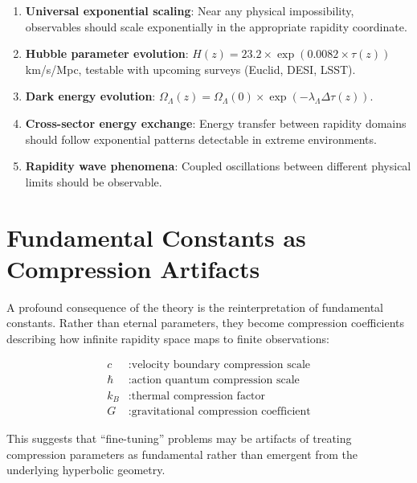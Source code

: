 \documentclass[12pt,a4paper]{article}
\begin{document}
\begin{enumerate}
    \item \textbf{Universal exponential scaling}: Near any physical impossibility, 
                                                  observables should scale exponentially 
                                                  in the appropriate rapidity coordinate.    
    \item \textbf{Hubble parameter evolution}: $H(z) = 23.2 \times \exp(0.0082 \times \tau(z))$ km/s/Mpc, 
                                               testable with upcoming surveys (Euclid, DESI, LSST).    
    \item \textbf{Dark energy evolution}: $\Omega_\Lambda(z) = \Omega_\Lambda(0) \times \exp(-\lambda_\Lambda \Delta\tau(z))$.    
    \item \textbf{Cross-sector energy exchange}: Energy transfer between rapidity 
                                                 domains should follow exponential 
                                                 patterns detectable in extreme 
                                                 environments.
    \item \textbf{Rapidity wave phenomena}: Coupled oscillations between different 
                                            physical limits should be observable.
\end{enumerate}

\section{Fundamental Constants as Compression Artifacts}

A profound consequence of the theory is the reinterpretation of fundamental constants. 
Rather than eternal parameters, they become compression coefficients describing 
how infinite rapidity space maps to finite observations:

\begin{align}
c       & : \text{velocity boundary compression scale} \\
\hbar   & : \text{action quantum compression scale} \\
k_B     & : \text{thermal compression factor} \\
G       & : \text{gravitational compression coefficient}
\end{align}

This suggests that ``fine-tuning'' problems may be artifacts of treating compression 
parameters as fundamental rather than emergent from the underlying hyperbolic geometry.
\end{document}
